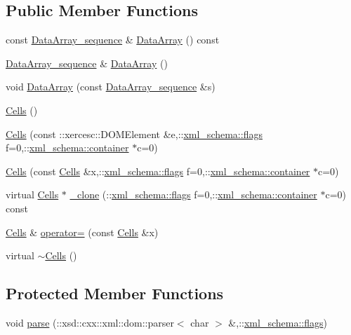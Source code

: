 \subsection*{Public Member Functions}
\begin{DoxyCompactItemize}
\item 
const \hyperlink{classCells_ae2856ec1cc2c6d6a2ccac9de9a22c7b7}{Data\+Array\+\_\+sequence} \& \hyperlink{classCells_a8844f4f5a352181f29e8589d72fba69f}{Data\+Array} () const 
\item 
\hyperlink{classCells_ae2856ec1cc2c6d6a2ccac9de9a22c7b7}{Data\+Array\+\_\+sequence} \& \hyperlink{classCells_a6114566d42273127f9cb92b1d0f09cb5}{Data\+Array} ()
\item 
void \hyperlink{classCells_a52c9971e15358118dd90ecf68b26601e}{Data\+Array} (const \hyperlink{classCells_ae2856ec1cc2c6d6a2ccac9de9a22c7b7}{Data\+Array\+\_\+sequence} \&s)
\item 
\hyperlink{classCells_a092d62bc15648a54755a413dbf9a2db0}{Cells} ()
\item 
\hyperlink{classCells_a79e3031094d928c8d275198201d44f0c}{Cells} (const \+::xercesc\+::\+D\+O\+M\+Element \&e,\+::\hyperlink{namespacexml__schema_a0612287d030cb2732d31a45b258fdc87}{xml\+\_\+schema\+::flags} f=0,\+::\hyperlink{namespacexml__schema_ada9aa30dc722e93ee2ed7243085402a5}{xml\+\_\+schema\+::container} $\ast$c=0)
\item 
\hyperlink{classCells_a9322653263fb302eb7068be10b1b364f}{Cells} (const \hyperlink{classCells}{Cells} \&x,\+::\hyperlink{namespacexml__schema_a0612287d030cb2732d31a45b258fdc87}{xml\+\_\+schema\+::flags} f=0,\+::\hyperlink{namespacexml__schema_ada9aa30dc722e93ee2ed7243085402a5}{xml\+\_\+schema\+::container} $\ast$c=0)
\item 
virtual \hyperlink{classCells}{Cells} $\ast$ \hyperlink{classCells_a67e7fa1cc404dcc4814011ca179f8a83}{\+\_\+clone} (\+::\hyperlink{namespacexml__schema_a0612287d030cb2732d31a45b258fdc87}{xml\+\_\+schema\+::flags} f=0,\+::\hyperlink{namespacexml__schema_ada9aa30dc722e93ee2ed7243085402a5}{xml\+\_\+schema\+::container} $\ast$c=0) const 
\item 
\hyperlink{classCells}{Cells} \& \hyperlink{classCells_a99df5dc58374d8a8d4794531e192f821}{operator=} (const \hyperlink{classCells}{Cells} \&x)
\item 
virtual \hyperlink{classCells_aab121634db81b439226a33fd099fb3c1}{$\sim$\+Cells} ()
\end{DoxyCompactItemize}
\subsection*{Protected Member Functions}
\begin{DoxyCompactItemize}
\item 
void \hyperlink{classCells_a90d91435b44503cd02934902007a3ace}{parse} (\+::xsd\+::cxx\+::xml\+::dom\+::parser$<$ char $>$ \&,\+::\hyperlink{namespacexml__schema_a0612287d030cb2732d31a45b258fdc87}{xml\+\_\+schema\+::flags})
\end{DoxyCompactItemize}

